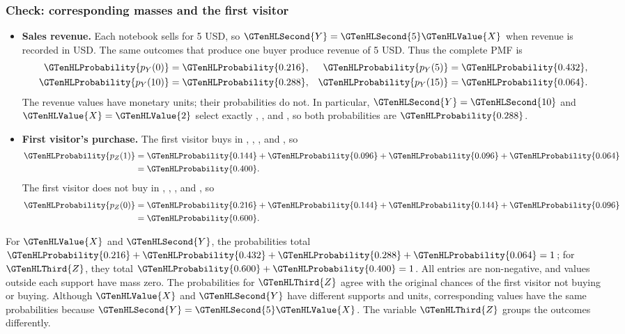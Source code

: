 \subsubsection*{Check: corresponding masses and the first visitor}\label{check:sale-comparisons}
\begin{itemize}
\item \textbf{Sales revenue.}
	Each notebook sells for 5 USD, so $\GTenHLSecond{Y}=\GTenHLSecond{5}\GTenHLValue{X}$ when revenue
	is recorded in USD. The same outcomes that produce one
	buyer produce revenue of 5 USD. Thus the complete PMF is
	\[
	\begin{aligned}
		\GTenHLProbability{p_{Y}(0)}&=\GTenHLProbability{0.216}, & \GTenHLProbability{p_{Y}(5)}&=\GTenHLProbability{0.432},\\
		\GTenHLProbability{p_{Y}(10)}&=\GTenHLProbability{0.288}, & \GTenHLProbability{p_{Y}(15)}&=\GTenHLProbability{0.064}.
	\end{aligned}
	\]
	The revenue values have monetary units; their
	probabilities do not. In particular, $\GTenHLSecond{Y}=\GTenHLSecond{10}$ and $\GTenHLValue{X}=\GTenHLValue{2}$ select exactly , , and , so both probabilities are $\GTenHLProbability{0.288}$.

	\item \textbf{First visitor's purchase.}
	The first visitor buys in , , , and , so
	\[
	\begin{aligned}
		\GTenHLProbability{p_{Z}(1)}
		&=\GTenHLProbability{0.144}+\GTenHLProbability{0.096}+\GTenHLProbability{0.096}+\GTenHLProbability{0.064}\\
		&=\GTenHLProbability{0.400}.
	\end{aligned}
	\]
	The first visitor does not buy in , , ,
	and , so
	\[
	\begin{aligned}
		\GTenHLProbability{p_{Z}(0)}
		&=\GTenHLProbability{0.216}+\GTenHLProbability{0.144}+\GTenHLProbability{0.144}+\GTenHLProbability{0.096}\\
		&=\GTenHLProbability{0.600}.
	\end{aligned}
	\]
\end{itemize}

For $\GTenHLValue{X}$ and $\GTenHLSecond{Y}$, the probabilities total $\GTenHLProbability{0.216}+\GTenHLProbability{0.432}+\GTenHLProbability{0.288}+\GTenHLProbability{0.064}=1$; for $\GTenHLThird{Z}$, they total $\GTenHLProbability{0.600}+\GTenHLProbability{0.400}=1$. All entries are non-negative, and values outside each support have mass zero. The probabilities for $\GTenHLThird{Z}$ agree with the original chances of the first visitor not buying or buying. Although $\GTenHLValue{X}$ and $\GTenHLSecond{Y}$ have different supports and units, corresponding values have the same probabilities because $\GTenHLSecond{Y}=\GTenHLSecond{5}\GTenHLValue{X}$. The variable $\GTenHLThird{Z}$ groups the outcomes differently.

